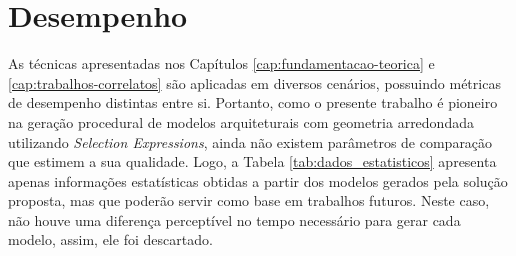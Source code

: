 \newpage

\section{Desempenho}
\label{sec:desempenho}

As técnicas apresentadas nos Capítulos \ref{cap:fundamentacao-teorica} e \ref{cap:trabalhos-correlatos} são aplicadas em diversos cenários, possuindo métricas de desempenho distintas entre si. Portanto, como o presente trabalho é pioneiro na geração procedural de modelos arquiteturais com geometria arredondada utilizando \textit{Selection Expressions}, ainda não existem parâmetros de comparação que estimem a sua qualidade. Logo, a Tabela \ref{tab:dados_estatisticos} apresenta apenas informações estatísticas obtidas a partir dos modelos gerados pela solução proposta, mas que poderão servir como base em trabalhos futuros. Neste caso, não houve uma diferença perceptível no tempo necessário para gerar cada modelo, assim, ele foi descartado.

